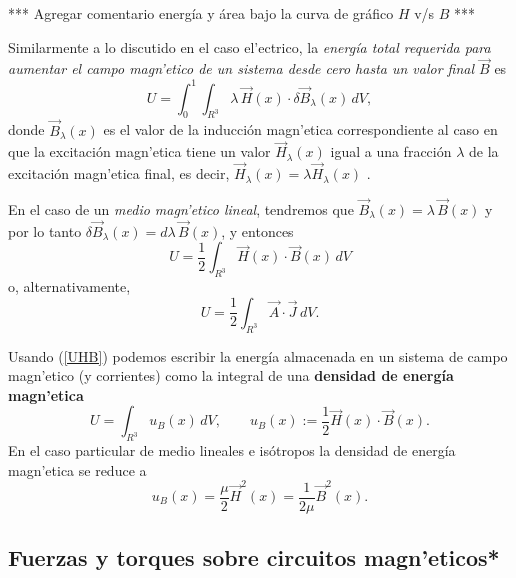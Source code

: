 *** Agregar comentario energía y área bajo la curva de gráfico $H$ v/s $B$ ***

Similarmente a lo discutido en el caso el'ectrico, la \textit{energía total requerida para aumentar el campo magn'etico de un sistema desde cero hasta un valor final $\vec{B}$} es 
\begin{equation}
 U=\int_0^1\int_{R^3} \lambda \, \vec{H}(x)\cdot \delta\vec{B}_\lambda(x)\,dV,
\end{equation}
donde $\vec{B}_\lambda(x)$ es el valor de la inducción magn'etica correspondiente al caso en que la excitación magn'etica tiene un valor $\vec{H}_\lambda(x)$ igual a una fracción $\lambda$ de la excitación magn'etica final, es decir, $\vec{H}_\lambda (x)=\lambda\vec{H}_\lambda (x)$ .

En el caso de un \textit{medio magn'etico lineal}, tendremos que $\vec{B}_\lambda (x)=\lambda\, \vec{B}(x)$ y por lo tanto $\delta\vec{B}_\lambda (x)=d\lambda\,
\vec{B}(x)$, y entonces
\begin{equation}\label{UHB}
 \boxed{U=\frac{1}{2}\int_{R^3} \vec{H}(x)\cdot\vec{B}(x)\,dV }
\end{equation}
o, alternativamente, 
\begin{equation}
 \boxed{U=\frac{1}{2}\int_{R^3} \vec{A}\cdot \vec{J}\,dV.}
\end{equation}

Usando (\ref{UHB}) podemos escribir la energía almacenada en un sistema de campo magn'etico (y corrientes) como la integral de una \textbf{densidad de energía magn'etica}
\begin{equation}
 \boxed{U=\int_{R^3} u_B(x)\,dV, \qquad u_B(x):=\frac{1}{2}\vec{H}(x)\cdot\vec{B}(x).}
\end{equation}
En el caso particular de medio lineales e isótropos la densidad de energía magn'etica se reduce a
\begin{equation}
 u_B(x)=\frac{\mu}{2}\vec{H}^2(x)=\frac{1}{2\mu}\vec{B}^2(x).
\end{equation}


\subsection{Fuerzas y torques sobre circuitos magn'eticos*}
%

